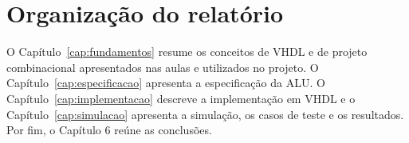 \section{Organização do relatório}

O Capítulo~\ref{cap:fundamentos} resume os conceitos de VHDL e de projeto combinacional apresentados nas aulas
e utilizados no projeto. O Capítulo~\ref{cap:especificacao} apresenta a especificação da ALU. O Capítulo~\ref{cap:implementacao} descreve a
implementação em VHDL e o Capítulo~\ref{cap:simulacao} apresenta a simulação, os casos de teste e os resultados.
Por fim, o Capítulo 6 reúne as conclusões.
